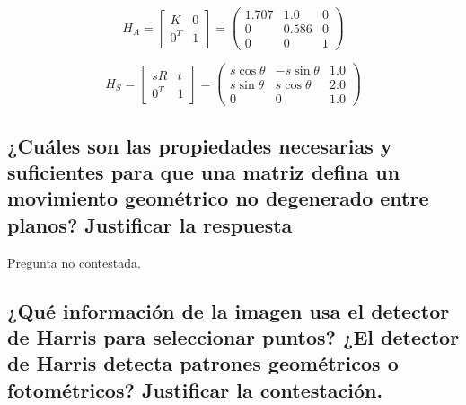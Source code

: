 \documentclass[11pt]{scrartcl} %
\begin{document}
\begin{equation}
H_{A} = \begin{bmatrix}K & 0 \\ 0^{T} & 1\end{bmatrix} = 
\left( 
	\begin{array}{c}1.707 \\ 0 \\ 0\end{array} 
	\begin{array}{c}1.0 \\ 0.586 \\ 0\end{array} 
	\begin{array}{c}0 \\ 0 \\ 1\end{array} 
\right)
\end{equation}

\begin{equation}
	H_{S} = \begin{bmatrix}sR & t \\ 0^{T} & 1\end{bmatrix} = 
	\left( 
		\begin{array}{c}s\cos\theta \\ s\sin\theta \\ 0\end{array} 
		\begin{array}{c}-s\sin\theta \\ s\cos\theta \\ 0\end{array} 
		\begin{array}{c}1.0 \\ 2.0 \\ 1.0\end{array} 
	\right)
\end{equation}

\subsection{¿Cuáles son las propiedades necesarias y suficientes para que
una matriz defina un movimiento geométrico no degenerado entre
planos? Justificar la respuesta}


Pregunta no contestada.

\subsection{¿Qué información de la imagen usa el detector de Harris para
seleccionar puntos? ¿El detector de Harris detecta patrones
geométricos o fotométricos? Justificar la contestación.}
\end{document}
